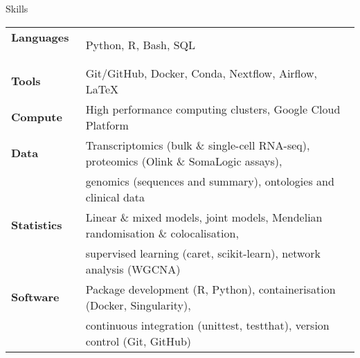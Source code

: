 \documentclass{resume}
\begin{document}
\begin{rSection}{Skills}

\begin{tabular}{ @{} >{\bfseries}l @{\hspace{3ex}} l }
Languages \ & Python, R, Bash, SQL \\ %
Tools \ & Git/GitHub, Docker, Conda, Nextflow, Airflow, \LaTeX \vspace{2pt plus 1pt minus 1pt} \\
Compute \ & High performance computing clusters, Google Cloud Platform \vspace{2pt plus 1pt minus 1pt} \\
Data \ & Transcriptomics (bulk \& single-cell RNA-seq), proteomics (Olink \& SomaLogic assays), \\
     \ & genomics (sequences and summary), ontologies and clinical data \vspace{2pt plus 1pt minus 1pt} \\
Statistics \ & Linear \& mixed models, joint models, Mendelian randomisation \& colocalisation, \\
           \ & supervised learning (caret, scikit-learn), network analysis (WGCNA) \vspace{2pt plus 1pt minus 1pt} \\
Software \ & Package development (R, Python), containerisation (Docker, Singularity),   \\
         \ & continuous integration (unittest, testthat), version control (Git, GitHub) \\
\end{tabular}


\end{rSection}
\end{document}
